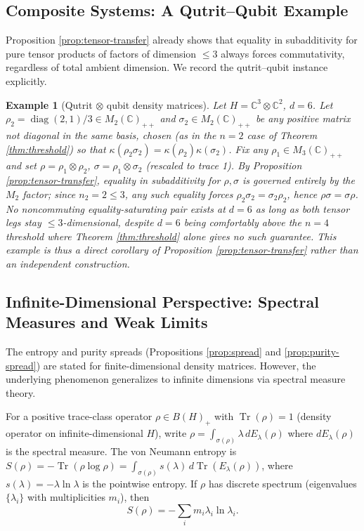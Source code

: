 \documentclass{article}
\newtheorem{example}[theorem]{Example}
\theoremstyle{remark}
\begin{document}
\subsection{Composite Systems: A Qutrit--Qubit Example}

Proposition \ref{prop:tensor-transfer} already shows that equality in subadditivity for pure tensor products of factors of dimension $\le3$ always forces commutativity, regardless of total ambient dimension. We record the qutrit--qubit instance explicitly.

\begin{example}[Qutrit $\otimes$ qubit density matrices]
Let $H=\mathbb{C}^3\otimes\mathbb{C}^2$, $d=6$. Let $\rho_2=\operatorname{diag}(2,1)/3\in M_2(\mathbb{C})_{++}$ and $\sigma_2\in M_2(\mathbb{C})_{++}$ be any positive matrix not diagonal in the same basis, chosen (as in the $n=2$ case of Theorem \ref{thm:threshold}) so that $\kappa(\rho_2\sigma_2)=\kappa(\rho_2)\kappa(\sigma_2)$. Fix any $\rho_1\in M_3(\mathbb{C})_{++}$ and set $\rho=\rho_1\otimes\rho_2$, $\sigma=\rho_1\otimes\sigma_2$ (rescaled to trace 1). By Proposition \ref{prop:tensor-transfer}, equality in subadditivity for $\rho,\sigma$ is governed entirely by the $M_2$ factor; since $n_2=2\le3$, any such equality forces $\rho_2\sigma_2=\sigma_2\rho_2$, hence $\rho\sigma=\sigma\rho$. No noncommuting equality-saturating pair exists at $d=6$ as long as both tensor legs stay $\le3$-dimensional, despite $d=6$ being comfortably above the $n=4$ threshold where Theorem \ref{thm:threshold} alone gives no such guarantee. This example is thus a direct corollary of Proposition \ref{prop:tensor-transfer} rather than an independent construction.
\end{example}

\subsection{Infinite-Dimensional Perspective: Spectral Measures and Weak Limits}\label{sec:inf-dim}

The entropy and purity spreads (Propositions \ref{prop:spread} and \ref{prop:purity-spread}) are stated for finite-dimensional density matrices. However, the underlying phenomenon generalizes to infinite dimensions via spectral measure theory.

For a positive trace-class operator $\rho\in B(H)_+$ with $\operatorname{Tr}(\rho)=1$ (density operator on infinite-dimensional $H$), write $\rho=\int_{\sigma(\rho)}\lambda\,dE_\lambda(\rho)$ where $dE_\lambda(\rho)$ is the spectral measure. The von Neumann entropy is $S(\rho)=-\operatorname{Tr}(\rho\log\rho)=\int_{\sigma(\rho)}s(\lambda)\,d\operatorname{Tr}(E_\lambda(\rho))$, where $s(\lambda)=-\lambda\ln\lambda$ is the pointwise entropy. If $\rho$ has discrete spectrum (eigenvalues $\{\lambda_i\}$ with multiplicities $m_i$), then
\[
S(\rho)=-\sum_im_i\lambda_i\ln\lambda_i.
\]
\end{document}
